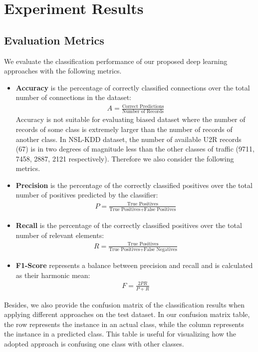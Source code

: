\section{Experiment Results}

\subsection{Evaluation Metrics}
We evaluate the classification performance of our proposed deep learning approaches
with the following metrics.
\begin{itemize}
    \item \textbf{Accuracy} is the percentage of correctly classified connections
        over the total number of connections in the dataset:
        \begin{align}
            A = \frac{\text{Correct Predictions}}{\text{Number of Records}}
        \end{align} 
        Accuracy is not suitable for evaluating biased dataset where the number
        of records of some class is extremely larger than the number of
        records of another class.
        In NSL-KDD dataset, the number of available U2R records (67)
        is in two degrees of magnitude less than the other classes of traffic (9711, 7458, 2887, 2121 respectively).
        Therefore we also consider the following metrics.
    \item \textbf{Precision} is the percentage of the correctly classified positives over
        the total number of positives predicted by the classifier:
                \begin{align}
                    P = \frac{\text{True Positives}}{\text{True Positives} + \text{False Positives}}
                \end{align}
            \item \textbf{Recall} is the percentage of the correctly classified positives over
                the total number of relevant elements:
                \begin{align}
                    R = \frac{\text{True Positives}}{\text{True Positives} + \text{False Negatives}}
                \end{align}
            \item \textbf{F1-Score} represents a balance between precision and recall and is calculated
                as their harmonic mean:
                \begin{align}
                    F = \frac{2PR}{P + R}
                \end{align}
\end{itemize}
Besides, we also provide the confusion matrix of the classification results when applying
different approaches on the test dataset.
In our confusion matrix table, the row represents the instance in an actual class,
while the column represents the instance in a predicted class.
This table is useful for visualizing how the adopted approach is confusing one class with
other classes.

